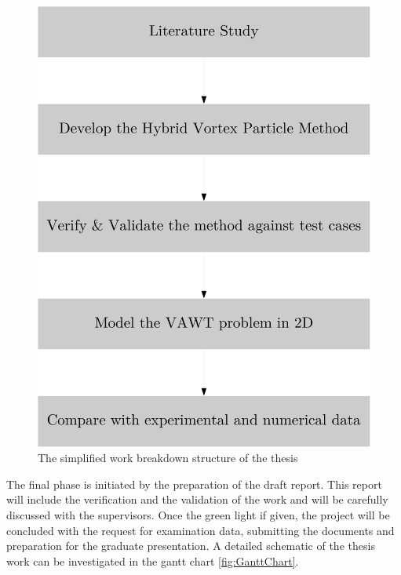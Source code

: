 \begin{figure}[htp]
\centering
\includegraphics[scale=0.3]{figures/FlowChart.pdf}
\caption{The simplified work breakdown structure of the thesis}
\label{fig:FlowChart}
\end{figure}

The final phase is initiated by the preparation of the draft report. This report will include the verification and the validation of the work and will be carefully discussed with the supervisors. Once the green light if given, the project will be concluded with the request for examination data, submitting the documents and preparation for the graduate presentation. A detailed schematic of the thesis work can be investigated in the gantt chart \ref{fig:GanttChart}.\\

